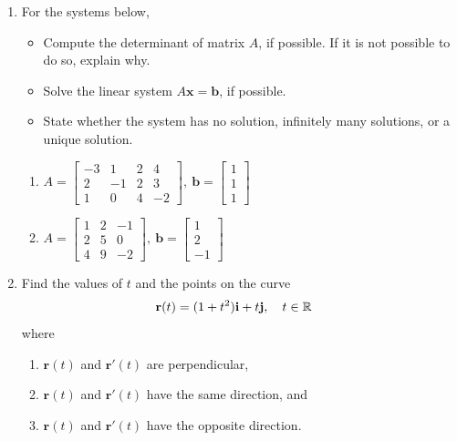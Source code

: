 \documentclass{article}
\begin{document}
\begin{enumerate}
\item
For the systems below,
\begin{itemize}
\item Compute the determinant of matrix $A$, if possible. If it is not possible to do so, explain why. 
\item Solve the linear system $A\mathbf{x} = \mathbf{b}$, if possible. 
\item State whether the system has no solution, infinitely many solutions, or a unique solution.
\end{itemize}

\begin{enumerate}
\item \(
 A = \begin{bmatrix}
  -3 &  1 & 2 &  4 \\
   2 & -1 & 2 &  3 \\
   1 &  0 & 4 & -2
 \end{bmatrix}, \ 
 \mathbf{b} = \begin{bmatrix} 1 \\ 1 \\ 1 \end{bmatrix}
\)
\item \( A = \begin{bmatrix}
 1 & 2 & -1 \\
 2 & 5 & 0 \\
 4 & 9 & -2
\end{bmatrix} , \ 
 \mathbf{b} =
\begin{bmatrix} 1 \\ 2 \\ -1 \end{bmatrix} \)
\end{enumerate}

\item 
Find the values of $t$ and the points on the curve 
\begin{align*}
  \mathbf{r}(t) &= (1+t^2) \mathbf{i} + t\mathbf{j}, \quad t\in \mathbb{R}
\end{align*}
where
\begin{enumerate}
  \item $\mathbf{r}(t)$ and $\mathbf{r}'(t)$ are perpendicular,
  \item $\mathbf{r}(t)$ and $\mathbf{r}'(t)$ have the same direction, and
  \item $\mathbf{r}(t)$ and $\mathbf{r}'(t)$ have the opposite direction.   
\end{enumerate}


\end{enumerate}
\end{document}
